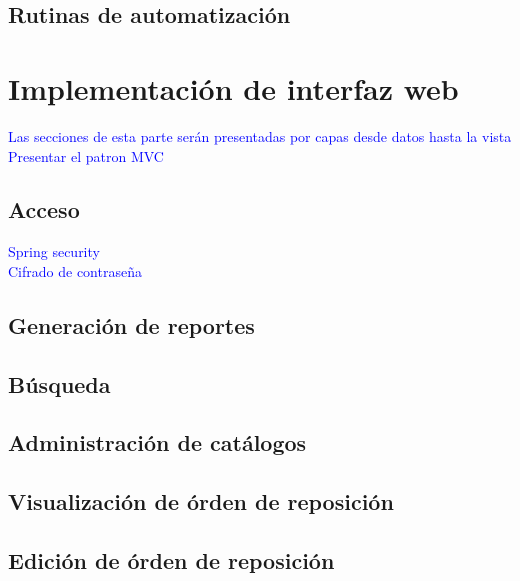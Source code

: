 \subsection{Rutinas de automatización}

\section{Implementación de interfaz web}
\textcolor{blue}{Las secciones de esta parte serán presentadas por capas desde datos hasta la vista}\\
\textcolor{blue}{Presentar el patron MVC}\\
\subsection{Acceso}
\textcolor{blue}{Spring security}\\
\textcolor{blue}{Cifrado de contraseña}\\
\subsection{Generación de reportes}
\subsection{Búsqueda}

\subsection{Administración de catálogos}

\subsection{Visualización de órden de reposición}

\subsection{Edición de órden de reposición}
